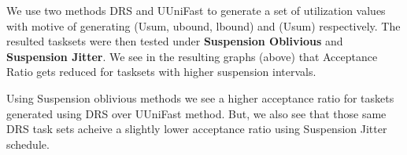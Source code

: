 \documentclass[]{article}
\begin{document}
{
\raggedleft
We use two methods DRS and UUniFast to generate a set of utilization values with motive of generating (Usum, ubound, lbound) and (Usum) respectively. The resulted tasksets were then tested under \textbf{Suspension Oblivious} and \textbf{Suspension Jitter}. We see in the resulting graphs (above) that Acceptance Ratio gets reduced for tasksets with higher suspension intervals. \newline 
}

{
\raggedleft
Using Suspension oblivious methods we see a higher acceptance ratio for taskets generated using DRS over UUniFast method. But, we also see that those same DRS task sets acheive a slightly lower acceptance ratio using Suspension Jitter schedule. 
}
\end{document}
